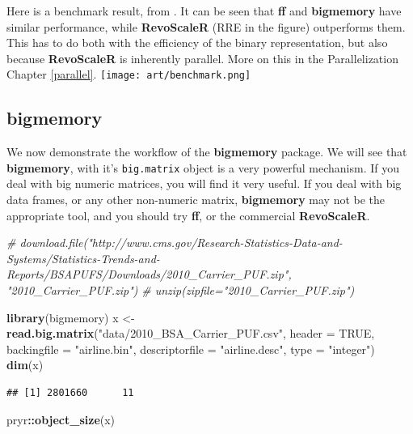 \documentclass[]{book}
\newenvironment{Shaded}{\begin{snugshade}}{\end{snugshade}}
\newcommand{\CommentTok}[1]{\textcolor[rgb]{0.56,0.35,0.01}{\textit{#1}}}
\newcommand{\DataTypeTok}[1]{\textcolor[rgb]{0.13,0.29,0.53}{#1}}
\newcommand{\KeywordTok}[1]{\textcolor[rgb]{0.13,0.29,0.53}{\textbf{#1}}}
\newcommand{\NormalTok}[1]{#1}
\newcommand{\OperatorTok}[1]{\textcolor[rgb]{0.81,0.36,0.00}{\textbf{#1}}}
\newcommand{\OtherTok}[1]{\textcolor[rgb]{0.56,0.35,0.01}{#1}}
\newcommand{\StringTok}[1]{\textcolor[rgb]{0.31,0.60,0.02}{#1}}
\theoremstyle{definition}
\theoremstyle{definition}
\theoremstyle{definition}
\theoremstyle{remark}
\begin{document}
Here is a benchmark result, from \citet{wang2015statistical}.
It can be seen that \textbf{ff} and \textbf{bigmemory} have similar performance, while \textbf{RevoScaleR} (RRE in the figure) outperforms them.
This has to do both with the efficiency of the binary representation, but also because \textbf{RevoScaleR} is inherently parallel.
More on this in the Parallelization Chapter \ref{parallel}.
\texttt{[image: art/benchmark.png]}

\hypertarget{bigmemory}{%
\subsection{bigmemory}\label{bigmemory}}

We now demonstrate the workflow of the \textbf{bigmemory} package.
We will see that \textbf{bigmemory}, with it's \texttt{big.matrix} object is a very powerful mechanism.
If you deal with big numeric matrices, you will find it very useful.
If you deal with big data frames, or any other non-numeric matrix, \textbf{bigmemory} may not be the appropriate tool, and you should try \textbf{ff}, or the commercial \textbf{RevoScaleR}.

\begin{Shaded}
\begin{Highlighting}[]
\CommentTok{# download.file("http://www.cms.gov/Research-Statistics-Data-and-Systems/Statistics-Trends-and-Reports/BSAPUFS/Downloads/2010_Carrier_PUF.zip", "2010_Carrier_PUF.zip")}
\CommentTok{# unzip(zipfile="2010_Carrier_PUF.zip")}

\KeywordTok{library}\NormalTok{(bigmemory)}
\NormalTok{x <-}\StringTok{ }\KeywordTok{read.big.matrix}\NormalTok{(}\StringTok{"data/2010_BSA_Carrier_PUF.csv"}\NormalTok{, }\DataTypeTok{header =} \OtherTok{TRUE}\NormalTok{, }
                     \DataTypeTok{backingfile =} \StringTok{"airline.bin"}\NormalTok{, }
                     \DataTypeTok{descriptorfile =} \StringTok{"airline.desc"}\NormalTok{, }
                     \DataTypeTok{type =} \StringTok{"integer"}\NormalTok{)}
\KeywordTok{dim}\NormalTok{(x)}
\end{Highlighting}
\end{Shaded}

\begin{verbatim}
## [1] 2801660      11
\end{verbatim}

\begin{Shaded}
\begin{Highlighting}[]
\NormalTok{pryr}\OperatorTok{::}\KeywordTok{object_size}\NormalTok{(x)}
\end{Highlighting}
\end{Shaded}
\end{document}
